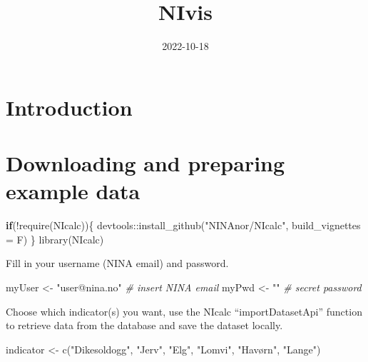 \documentclass[
]{book}
\title{NIvis}
\author{}
\date{\vspace{-2.5em}2022-10-18}
\newenvironment{Shaded}{\begin{snugshade}}{\end{snugshade}}
\newcommand{\AttributeTok}[1]{\textcolor[rgb]{0.77,0.63,0.00}{#1}}
\newcommand{\CommentTok}[1]{\textcolor[rgb]{0.56,0.35,0.01}{\textit{#1}}}
\newcommand{\ControlFlowTok}[1]{\textcolor[rgb]{0.13,0.29,0.53}{\textbf{#1}}}
\newcommand{\FunctionTok}[1]{\textcolor[rgb]{0.00,0.00,0.00}{#1}}
\newcommand{\NormalTok}[1]{#1}
\newcommand{\OtherTok}[1]{\textcolor[rgb]{0.56,0.35,0.01}{#1}}
\newcommand{\SpecialCharTok}[1]{\textcolor[rgb]{0.00,0.00,0.00}{#1}}
\newcommand{\StringTok}[1]{\textcolor[rgb]{0.31,0.60,0.02}{#1}}
\begin{document}
\maketitle

{
\setcounter{tocdepth}{1}
\tableofcontents
}
\hypertarget{introduction}{%
\chapter{Introduction}\label{introduction}}

\hypertarget{downloading-and-preparing-example-data}{%
\chapter{Downloading and preparing example data}\label{downloading-and-preparing-example-data}}

\begin{Shaded}
\begin{Highlighting}[]
\ControlFlowTok{if}\NormalTok{(}\SpecialCharTok{!}\FunctionTok{require}\NormalTok{(NIcalc))\{}
\NormalTok{  devtools}\SpecialCharTok{::}\FunctionTok{install\_github}\NormalTok{(}\StringTok{"NINAnor/NIcalc"}\NormalTok{, }\AttributeTok{build\_vignettes =}\NormalTok{ F)}
\NormalTok{\}}
\FunctionTok{library}\NormalTok{(NIcalc)}
\end{Highlighting}
\end{Shaded}

Fill in your username (NINA email) and password.

\begin{Shaded}
\begin{Highlighting}[]

\NormalTok{myUser }\OtherTok{\textless{}{-}} \StringTok{"user@nina.no"} \CommentTok{\# insert NINA email}
\NormalTok{myPwd  }\OtherTok{\textless{}{-}} \StringTok{""} \CommentTok{\# secret password}
\end{Highlighting}
\end{Shaded}

Choose which indicator(s) you want, use the NIcalc ``importDatasetApi'' function to retrieve data from the database and save the dataset locally.

\begin{Shaded}
\begin{Highlighting}[]
\NormalTok{indicator }\OtherTok{\textless{}{-}} \FunctionTok{c}\NormalTok{(}\StringTok{"Dikesoldogg"}\NormalTok{,}
               \StringTok{"Jerv"}\NormalTok{,}
               \StringTok{"Elg"}\NormalTok{,}
               \StringTok{"Lomvi"}\NormalTok{,}
               \StringTok{"Havørn"}\NormalTok{,}
               \StringTok{"Lange"}\NormalTok{)}
\end{Highlighting}
\end{Shaded}
\end{document}
